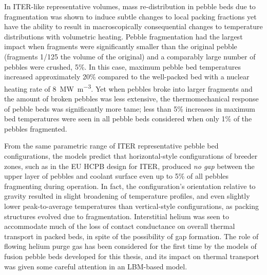 {In ITER-like representative volumes, mass re-distribution in pebble beds due to fragmentation was shown to induce subtle changes to local packing fractions yet have the ability to result in macroscopically consequential changes to temperature distributions with volumetric heating. Pebble fragmentation had the largest impact when fragments were significantly smaller than the original pebble (fragments 1/125 the volume of the original) and a comparably large number of pebbles were crushed, 5\%. In this case, maximum pebble bed temperatures increased approximately 20\% compared to the well-packed bed with a nuclear heating rate of \SI{8}{\mega\watt\per\cubic\meter}. Yet when pebbles broke into larger fragments and the amount of broken pebbles was less extensive, the thermomechanical response of pebble beds was significantly more tame; less than 5\% increases in maximum bed temperatures were seen in all pebble beds considered when only 1\% of the pebbles fragmented. %



From the same parametric range of ITER representative pebble bed configurations, the models predict that horizontal-style configurations of breeder zones, such as in the EU HCPB design for ITER, produced \textit{no gap} between the upper layer of pebbles and coolant surface even up to 5\% of all pebbles fragmenting during operation. In fact, the configuration’s orientation relative to gravity resulted in slight broadening of temperature profiles, and even slightly lower peak-to-average temperatures than vertical-style configurations, as packing structures evolved due to fragmentation. Interstitial helium was seen to accommodate much of the loss of contact conductance on overall thermal transport in packed beds, in spite of the possibility of gap formation. The role of flowing helium purge gas has been considered for the first time by the models of fusion pebble beds developed for this thesis, and its impact on thermal transport was given some careful attention in an LBM-based model. 

}
